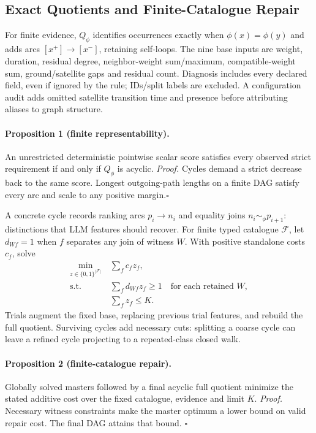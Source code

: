 \subsection{Exact Quotients and Finite-Catalogue Repair}
\label{sec:method:repair}
For finite evidence, $Q_\phi$ identifies occurrences exactly when
$\phi(x)=\phi(y)$ and adds arcs $[x^+]\to[x^-]$, retaining self-loops.
The nine base inputs are weight, duration, residual degree, neighbor-weight
sum/maximum, compatible-weight sum, ground/satellite gaps and residual count.
Diagnosis includes every declared field, even if ignored by the rule;
IDs/split labels are excluded. A configuration audit adds omitted satellite
transition time and presence before attributing aliases to graph structure.

\paragraph{Proposition 1 (finite representability).}
An unrestricted deterministic pointwise scalar score satisfies every
observed strict requirement if and only if $Q_\phi$ is acyclic.
\emph{Proof.} Cycles demand a strict decrease back to the same score.
Longest outgoing-path lengths on a finite DAG satisfy every arc and scale
to any positive margin.\hfill$\square$

A concrete cycle records ranking arcs $p_i\to n_i$ and equality joins
$n_i\sim_\phi p_{i+1}$: distinctions that LLM features should recover.
For finite typed catalogue $\mathcal F$, let $d_{Wf}=1$ when $f$ separates
any join of witness $W$. With positive standalone costs $c_f$, solve
\begin{equation}
 \begin{split}
 \min_{z\in\{0,1\}^{|\mathcal F|}}\ &\sum_f c_fz_f,\\
 \text{s.t. }&\sum_f d_{Wf}z_f\geq1\quad\text{for each retained }W,\\
 &\sum_f z_f\leq K.
 \end{split}
 \label{eq:repair-cover}
\end{equation}
Trials augment the fixed base, replacing previous trial features, and
rebuild the full quotient. Surviving cycles add necessary cuts: splitting
a coarse cycle can leave a refined cycle projecting to a repeated-class
closed walk.

\paragraph{Proposition 2 (finite-catalogue repair).}
Globally solved masters followed by a final acyclic full quotient minimize
the stated additive cost over the fixed catalogue, evidence and limit $K$.
\emph{Proof.} Necessary witness constraints make the master optimum a
lower bound on valid repair cost. The final DAG attains that bound.
\hfill$\square$


